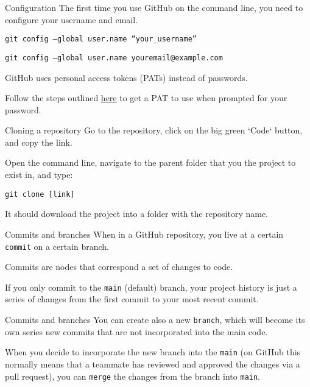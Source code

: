 \begin{frame}{Configuration}
    The first time you use GitHub on the command line,
    you need to configure your username and email.

    \texttt{git config --global user.name ``your\_username''}

    \texttt{git config --global user.name youremail@example.com}

    GitHub uses personal access tokens (PATs) instead of passwords.

    Follow the steps outlined \href{https://docs.github.com/en/authentication/keeping-your-account-and-data-secure/creating-a-personal-access-token}{here} to get a PAT to use
    when prompted for your password.
\end{frame}

\begin{frame}{Cloning a repository}
    Go to the repository, click on the big green `Code` button, and copy the link.

    Open the command line, navigate to the parent folder that you the project
    to exist in, and type:

    \texttt{git clone [link]}

    It should download the project into a folder with the repository name.
\end{frame}

\begin{frame}{Commits and branches}
    When in a GitHub repository, you live at a certain \texttt{commit} on a certain branch.

    Commits are nodes that correspond a set of changes to code.

    If you only commit to the \texttt{main} (default) branch,
    your project history is just a series of changes from the first commit to your
    most recent commit.
\end{frame}

\begin{frame}{Commits and branches}
    \stretchon
    You can create also a new \texttt{branch},
    which will become its own series new commits that are not incorporated into the
    main code.

    When you decide to incorporate the new branch into the \texttt{main}
    (on GitHub this normally means that a teammate has reviewed and approved
    the changes via a pull request),
    you can \texttt{merge} the changes from the branch into \texttt{main}.
\end{frame}


